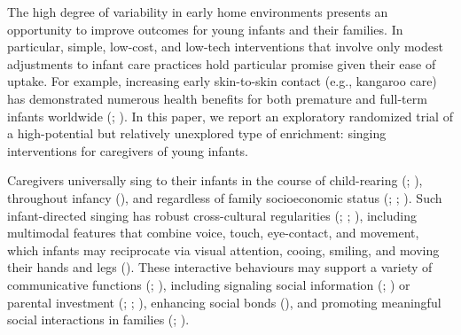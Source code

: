 \documentclass[
]{article}
\begin{document}
The high degree of variability in early home environments presents an
opportunity to improve outcomes for young infants and their families. In
particular, simple, low-cost, and low-tech interventions that involve
only modest adjustments to infant care practices hold particular promise
given their ease of uptake. For example, increasing early skin-to-skin
contact (e.g., kangaroo care) has demonstrated numerous health benefits
for both premature and full-term infants worldwide
(;
). In this paper, we report
an exploratory randomized trial of a high-potential but relatively
unexplored type of enrichment: singing interventions for caregivers of
young infants.

Caregivers universally sing to their infants in the course of
child-rearing (;
), throughout infancy
(), and regardless of family
socioeconomic status (;
;
). Such
infant-directed singing has robust cross-cultural regularities
(;
;
), including multimodal
features that combine voice, touch, eye-contact, and movement, which
infants may reciprocate via visual attention, cooing, smiling, and
moving their hands and legs (). These interactive behaviours may support a variety
of communicative functions (; ),
including signaling social information (; ) or parental
investment (;
;
), enhancing social bonds
(), and promoting
meaningful social interactions in families
(;
).
\end{document}
